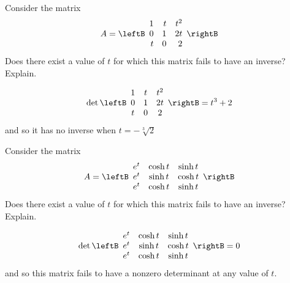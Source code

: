 \begin{enumialphparenastyle}
\begin{ex} Consider the matrix 
\begin{equation*}
A = 
\leftB
\begin{array}{rrr}
1 & t & t^{2} \\
0 & 1 & 2t \\
t & 0 & 2
\end{array}
\rightB
\end{equation*}
Does there exist a value of $t$ for which this matrix fails to have an
inverse? Explain.
\begin{sol}
\[
\det \leftB
\begin{array}{ccc}
1 & t & t^{2} \\
0 & 1 & 2t \\
t & 0 & 2
\end{array}
\rightB = t^{3}+2
\]
and so it has no inverse when $t=-\sqrt[3]{2}$
\end{sol}
\end{ex}

\begin{ex} Consider the matrix 
\begin{equation*}
A = 
\leftB
\begin{array}{ccc}
e^{t} & \cosh t & \sinh t \\
e^{t} & \sinh t & \cosh t \\
e^{t} & \cosh t & \sinh t
\end{array}
\rightB
\end{equation*}
Does there exist a value of $t$ for which this matrix fails to have an
inverse? Explain.
\begin{sol}
\[
\det \leftB
\begin{array}{ccc}
e^{t} & \cosh t & \sinh t \\
e^{t} & \sinh t & \cosh t \\
e^{t} & \cosh t & \sinh t
\end{array}
\rightB = 0
\]
and so this matrix fails to have a nonzero determinant at any value of $t$.
\end{sol}
\end{ex}


\end{enumialphparenastyle}
